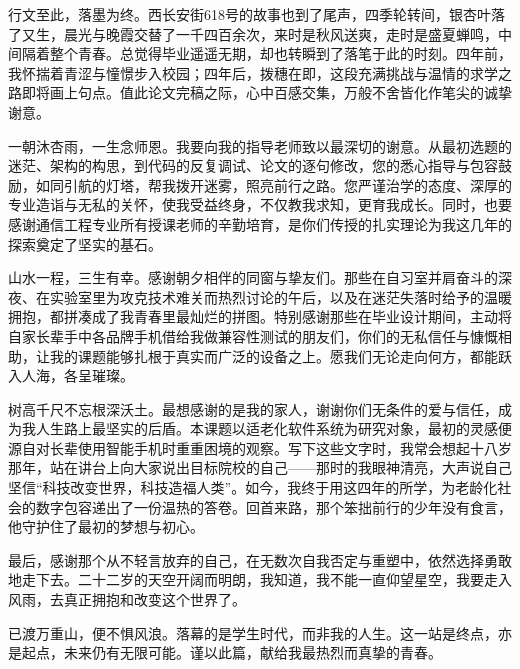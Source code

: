 \begin{acknowledgements}

行文至此，落墨为终。西长安街618号的故事也到了尾声，四季轮转间，银杏叶落了又生，晨光与晚霞交替了一千四百余次，来时是秋风送爽，走时是盛夏蝉鸣，中间隔着整个青春。总觉得毕业遥遥无期，却也转瞬到了落笔于此的时刻。四年前，我怀揣着青涩与憧憬步入校园；四年后，拨穗在即，这段充满挑战与温情的求学之路即将画上句点。值此论文完稿之际，心中百感交集，万般不舍皆化作笔尖的诚挚谢意。

一朝沐杏雨，一生念师恩。我要向我的指导老师致以最深切的谢意。从最初选题的迷茫、架构的构思，到代码的反复调试、论文的逐句修改，您的悉心指导与包容鼓励，如同引航的灯塔，帮我拨开迷雾，照亮前行之路。您严谨治学的态度、深厚的专业造诣与无私的关怀，使我受益终身，不仅教我求知，更育我成长。同时，也要感谢通信工程专业所有授课老师的辛勤培育，是你们传授的扎实理论为我这几年的探索奠定了坚实的基石。

山水一程，三生有幸。感谢朝夕相伴的同窗与挚友们。那些在自习室并肩奋斗的深夜、在实验室里为攻克技术难关而热烈讨论的午后，以及在迷茫失落时给予的温暖拥抱，都拼凑成了我青春里最灿烂的拼图。特别感谢那些在毕业设计期间，主动将自家长辈手中各品牌手机借给我做兼容性测试的朋友们，你们的无私信任与慷慨相助，让我的课题能够扎根于真实而广泛的设备之上。愿我们无论走向何方，都能跃入人海，各呈璀璨。

树高千尺不忘根深沃土。最想感谢的是我的家人，谢谢你们无条件的爱与信任，成为我人生路上最坚实的后盾。本课题以适老化软件系统为研究对象，最初的灵感便源自对长辈使用智能手机时重重困境的观察。写下这些文字时，我常会想起十八岁那年，站在讲台上向大家说出目标院校的自己——那时的我眼神清亮，大声说自己坚信“科技改变世界，科技造福人类”。如今，我终于用这四年的所学，为老龄化社会的数字包容递出了一份温热的答卷。回首来路，那个笨拙前行的少年没有食言，他守护住了最初的梦想与初心。

最后，感谢那个从不轻言放弃的自己，在无数次自我否定与重塑中，依然选择勇敢地走下去。二十二岁的天空开阔而明朗，我知道，我不能一直仰望星空，我要走入风雨，去真正拥抱和改变这个世界了。

已渡万重山，便不惧风浪。落幕的是学生时代，而非我的人生。这一站是终点，亦是起点，未来仍有无限可能。谨以此篇，献给我最热烈而真挚的青春。

\end{acknowledgements}
